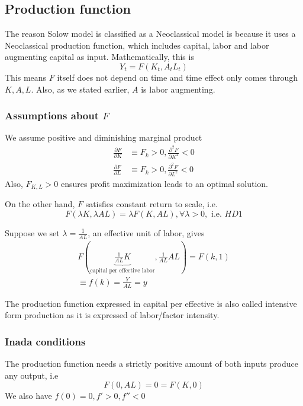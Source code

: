 \documentclass[twocolumn, fleqn]{article}
\begin{document}
		\subsection{Production function}
			The reason Solow model is classified as a Neoclassical model is because it uses a Neoclassical
			production function, which includes capital, labor and labor augmenting capital as input.
			Mathematically, this is
			\begin{equation}
				Y_t = F(K_t, A_t L_t)\label{eq:neoclassical_production}
			\end{equation}
			This means $F$ itself does not depend on time and time effect only comes through $K, A, L$.
			Also, as we stated earlier, $A$ is labor augmenting.

			\subsubsection{Assumptions about $F$}
				We assume positive and diminishing marginal product
				\begin{align*}
					\frac{\partial F}{\partial K} &\equiv F_k >0, \frac{\partial^2 F}{\partial K^2} <0\\[4pt]
					\frac{\partial F}{\partial L} &\equiv F_k >0, \frac{\partial^2 F}{\partial L^2} <0
				\end{align*}
				Also, $F_{K,L}>0$ ensures profit maximization leads to an optimal solution.

				On the other hand, $F$ satisfies constant return to scale, i.e.
				\begin{equation*}
					F(\lambda K, \lambda AL) = \lambda F(K, AL), \forall \lambda >0, \text{ i.e. } HD1
				\end{equation*}

				Suppose we set $\lambda = \frac{1}{AL}$, an effective unit of labor, gives
				\begin{align*}
					F(\underbrace{\frac{1}{AL}K}_{\text{capital per effective labor}}, \frac{1}{AL}AL) = F(k,1) \\
					\equiv f(k) = \frac{Y}{AL} = y
				\end{align*}

				The production function expressed in capital per effective is also called intensive form production as it is expressed of labor/factor intensity.

			\subsubsection{Inada conditions}
				The production function needs a strictly positive amount of both inputs produce any output, i.e
				\begin{equation*}
					F(0,AL) = 0 = F(K,0)
				\end{equation*}
				We also have $f(0)=0, f' >0, f''<0$
\end{document}
